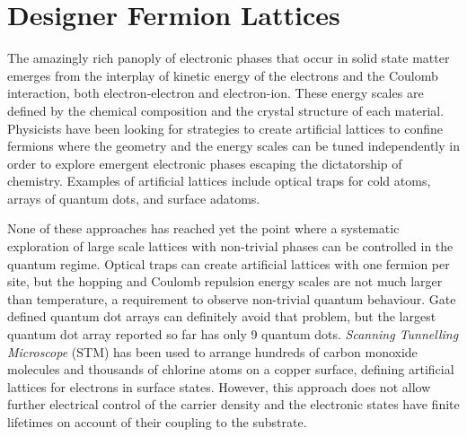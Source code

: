 \chapter{Designer Fermion Lattices}
\label{ch:designer}

The amazingly rich panoply of electronic phases that occur in solid state matter emerges from the interplay of kinetic energy of the electrons and the Coulomb interaction, both electron-electron and electron-ion. These energy scales are defined by the chemical composition and the crystal structure of each material. Physicists have been looking for strategies to create artificial lattices to confine fermions where the geometry and the energy scales can be tuned independently in order to explore emergent electronic phases escaping the dictatorship of chemistry.
Examples of artificial lattices include optical traps for cold atoms\cite{Cocchi2016}, arrays of quantum dots\cite{mortemousque2018,dehollain2019}, and surface adatoms\cite{gomes2012,drost2017,girovsky2017,khajetoorians2019}. 


None of these approaches has reached yet the point where a systematic exploration of large scale lattices with non-trivial phases can be controlled in the quantum regime.
Optical traps can create artificial lattices with one fermion per site, but the hopping and Coulomb repulsion energy scales are not much larger than temperature,\cite{Cocchi2016} a requirement to observe non-trivial quantum behaviour.
Gate defined quantum dot arrays can definitely avoid that problem\cite{dehollain2019}, but the largest quantum dot array reported so far has only 9 quantum dots\cite{mortemousque2018}.
\emph{Scanning Tunnelling Microscope} (STM) has been used to arrange hundreds of carbon monoxide molecules\cite{gomes2012} and thousands of chlorine atoms\cite{Kalff2016} on a copper surface, defining artificial lattices for electrons in surface states. However, this approach does not allow further electrical control of the carrier density and the electronic states have finite lifetimes on account of their coupling to the substrate. 

